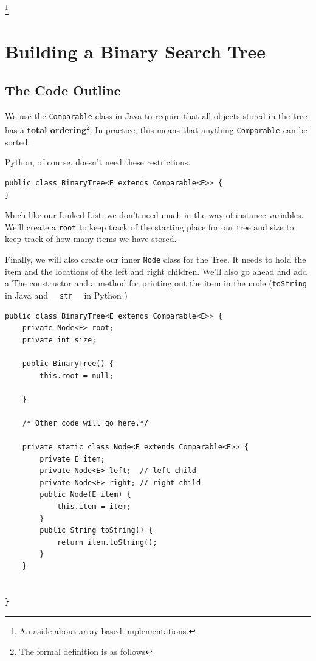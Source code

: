 \documentclass[10pt,a4paper]{book}
\begin{document}
\footnote{An aside about array based implementations.}

\section{Building a Binary Search Tree}

\subsection{The Code Outline}


We use the \texttt{Comparable} class in Java to require that all objects stored in the tree has a \textbf{total ordering}\footnote{The formal definition is as follows}.%
In practice, this means that anything \texttt{Comparable} can be sorted.

Python, of course, doesn't need these restrictions.
\begin{verbatim}
public class BinaryTree<E extends Comparable<E>> {
}
\end{verbatim}




Much like our Linked List, we don't need much in the way of instance variables.  We'll create a \texttt{root} to keep track of the starting place for our tree and size to keep track of how many items we have stored.

Finally, we will also create our inner \texttt{Node} class for the Tree.
It needs to hold the item and the locations of the left and right children.
We'll also go ahead and add a The constructor and a method for printing out the item in the node (\texttt{toString} in Java and \texttt{\_\_str\_\_} in Python )

\begin{verbatim}
public class BinaryTree<E extends Comparable<E>> {
	private Node<E> root;
	private int size;
	
	public BinaryTree() {
		this.root = null;
		
	}

	/* Other code will go here.*/

	private static class Node<E extends Comparable<E>> {
		private E item;
		private Node<E> left;  // left child
		private Node<E> right; // right child
		public Node(E item) {
			this.item = item;
		}
		public String toString() {
			return item.toString();
		}
	}

	
}
\end{verbatim}
\end{document}
